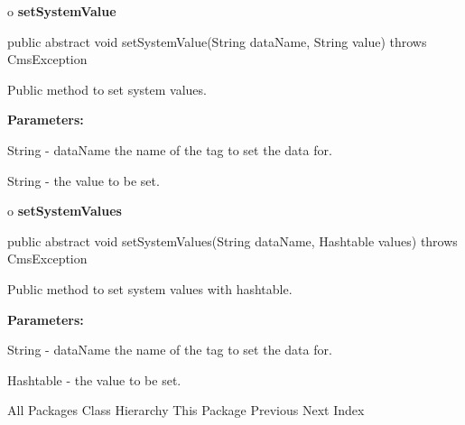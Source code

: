 o {\bf setSystemValue} 

\begin{PRE}
 public abstract void setSystemValue(String dataName,
                                     String value) throws CmsException
\end{PRE}

\begin{description}
\htmlDD Public method to set system values. 

\begin{description}
\item {\bf Parameters:}  

String - dataName the name of the tag to set the data for.  

String - the value to be set.  
\end{description}

\end{description}

o {\bf setSystemValues} 

\begin{PRE}
 public abstract void setSystemValues(String dataName,
                                      Hashtable values) throws CmsException
\end{PRE}

\begin{description}
\htmlDD Public method to set system values with hashtable. 

\begin{description}
\item {\bf Parameters:}  

String - dataName the name of the tag to set the data for.  

Hashtable - the value to be set.  
\end{description}

\end{description}

\htmlHR

\begin{PRE}
All Packages  Class Hierarchy  This Package  Previous  Next  Index
\end{PRE}

